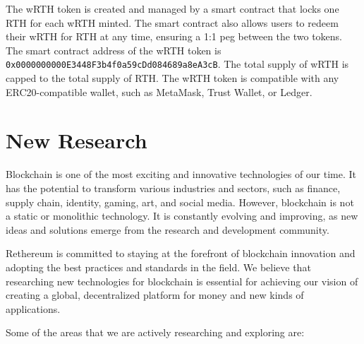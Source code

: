 \documentclass[a4paper,onecolumn, superscriptaddress,10pt,accepted=2020-05-01,issue=1, volume=2, shorttitle=papers]{compositionalityarticle}
\begin{document}
\vspace{0.3cm}

The wRTH token is created and managed by a smart contract that locks one RTH for each wRTH minted. The smart contract also allows users to redeem their wRTH for RTH at any time, ensuring a 1:1 peg between the two tokens. The smart contract address of the wRTH token is \texttt{0x0000000000E3448F3b4f0a59cDd084689a8eA3cB}. The total supply of wRTH is capped to the total supply of RTH. The wRTH token is compatible with any ERC20-compatible wallet, such as MetaMask, Trust Wallet, or Ledger.

\vspace{1cm}

\section{New Research}

Blockchain is one of the most exciting and innovative technologies of our time. It has the potential to transform various industries and sectors, such as finance, supply chain, identity, gaming, art, and social media. However, blockchain is not a static or monolithic technology. It is constantly evolving and improving, as new ideas and solutions emerge from the research and development community.

Rethereum is committed to staying at the forefront of blockchain innovation and adopting the best practices and standards in the field. We believe that researching new technologies for blockchain is essential for achieving our vision of creating a global, decentralized platform for money and new kinds of applications.

Some of the areas that we are actively researching and exploring are:
\end{document}
